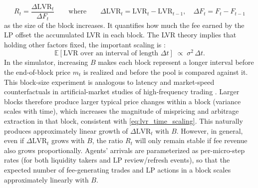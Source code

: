\documentclass[11pt]{article}
\begin{document}
\begin{equation}
    R_t = \frac{\Delta \text{LVR}_t}{\Delta F_t} \qquad \text{where} \qquad \Delta \text{LVR}_t = \text{LVR}_t-\text{LVR}_{t-1} ,\quad \Delta F_t=F_t-F_{t-1}
\end{equation}
as the size of the block increases. It quantifies how much the fee earned by the LP offset the accumulated LVR in each block.
The LVR theory implies that holding other factors fixed, the important scaling is \cite{milionis2023}:
\begin{equation}
  \mathbb{E}[\mathrm{LVR} \text{ over an interval of length } \Delta t]
  \;\propto\;
  \sigma^2 \,\Delta t.
  \label{eq:lvr_time_scaling}
\end{equation}
In the simulator, increasing $B$ makes each block represent a longer interval before the end-of-block price
$m_t$ is realized and before the pool is compared against it. This block-size experiment is analogous to latency and market-speed counterfactuals in artificial-market studies of high-frequency trading \cite{leal2016,gao2024}. Larger blocks therefore produce larger typical price
changes within a block (variance scales with time), which increases the magnitude of mispricing and arbitrage 
extraction in that block, consistent with \eqref{eq:lvr_time_scaling}. This naturally produces approximately linear 
growth of $\Delta\text{LVR}_t$ with $B$. However, in general, even if $\Delta\mathrm{LVR}_t$ grows with $B$, the 
ratio $R_t$ will only remain stable if fee revenue also grows proportionally.
Agents' arrivals are parameterized as per-micro-step rates (for both liquidity takers and LP review/refresh events), 
so that the expected number of fee-generating trades and LP actions in a block scales approximately linearly with $B$. 
\end{document}
